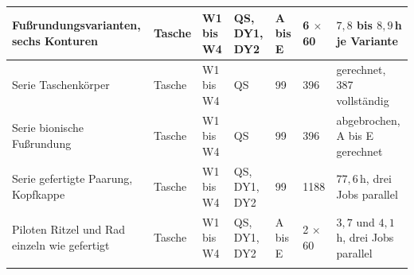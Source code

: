 \begin{table}[htbp]
\begin{tabular}{L{4.0cm}lllL{1.6cm}lL{2.0cm}}
		Fußrundungsvarianten, sechs Konturen                                           & Tasche & W1 bis W4 & QS, DY1, DY2 & A bis E    & 6 $\times$ 60 & $7{,}8$ bis $8{,}9$\,h je Variante         \\
		\hline
		Serie Taschenkörper                                                            & Tasche & W1 bis W4 & QS           & 99         & 396           & gerechnet, 387 vollständig                 \\
		\hline
		Serie bionische Fußrundung                                                     & Tasche & W1 bis W4 & QS           & 99         & 396           & abgebrochen, A bis E gerechnet             \\
		\hline
		Serie gefertigte Paarung, Kopfkappe                                            & Tasche & W1 bis W4 & QS, DY1, DY2 & 99         & 1188          & $77{,}6$\,h, drei Jobs parallel            \\
		\hline
		Piloten Ritzel und Rad einzeln wie gefertigt                                   & Tasche & W1 bis W4 & QS, DY1, DY2 & A bis E    & 2 $\times$ 60 & $3{,}7$ und $4{,}1$\,h, drei Jobs parallel \\
		\hline
	\end{tabular}
\end{table}


